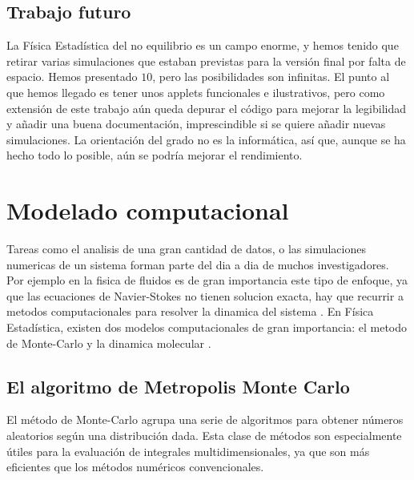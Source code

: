 \documentclass[11pt, a4paper]{article} %
\theoremstyle{named}
\begin{document}
\subsection{Trabajo futuro}\label{sec:futuro}

La Física Estadística del no equilibrio es un campo enorme, y hemos tenido que retirar varias simulaciones que estaban previstas para la versión final por falta de espacio.
Hemos presentado $10$, pero las posibilidades son infinitas.
El punto al que hemos llegado es tener unos applets funcionales e ilustrativos, pero como extensión de este trabajo aún queda depurar el código para mejorar la legibilidad y añadir una buena documentación, imprescindible si se quiere añadir nuevas simulaciones.
La orientación del grado no es la informática, así que, aunque se ha hecho todo lo posible, aún se podría mejorar el rendimiento.



\newpage
\appendix

\section{Modelado computacional}\label{sec:modComp}

Tareas como el analisis de una gran cantidad de datos, o las simulaciones numericas de un sistema forman parte del dia a dia de muchos investigadores.
Por ejemplo en la fisica de fluidos es de gran importancia este tipo de enfoque, ya que las ecuaciones de Navier-Stokes no tienen solucion exacta, hay que recurrir a metodos computacionales para resolver la dinamica del sistema \cite{allen}.
En Física Estadística, existen dos modelos computacionales de gran importancia: el metodo de Monte-Carlo y la dinamica molecular \cite{frenkel}.

\subsection{El algoritmo de Metropolis Monte Carlo}\label{sec:metropolis}

El método de Monte-Carlo \cite{barkema} agrupa una serie de algoritmos para obtener números aleatorios según una distribución dada. Esta clase de métodos son especialmente útiles para la evaluación de integrales multidimensionales, ya que son más eficientes que los métodos numéricos convencionales.
\end{document}
